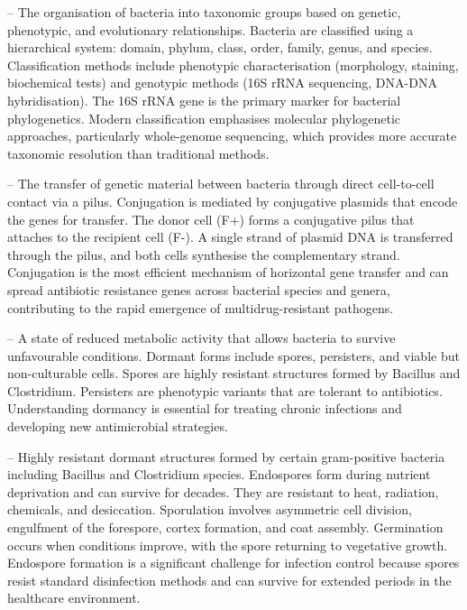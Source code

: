 -- The organisation of bacteria into taxonomic groups based on genetic, phenotypic, and evolutionary relationships. Bacteria are classified using a hierarchical system: domain, phylum, class, order, family, genus, and species. Classification methods include phenotypic characterisation (morphology, staining, biochemical tests) and genotypic methods (16S rRNA sequencing, DNA-DNA hybridisation). The 16S rRNA gene is the primary marker for bacterial phylogenetics. Modern classification emphasises molecular phylogenetic approaches, particularly whole-genome sequencing, which provides more accurate taxonomic resolution than traditional methods.

-- The transfer of genetic material between bacteria through direct cell-to-cell contact via a pilus. Conjugation is mediated by conjugative plasmids that encode the genes for transfer. The donor cell (F+) forms a conjugative pilus that attaches to the recipient cell (F-). A single strand of plasmid DNA is transferred through the pilus, and both cells synthesise the complementary strand. Conjugation is the most efficient mechanism of horizontal gene transfer and can spread antibiotic resistance genes across bacterial species and genera, contributing to the rapid emergence of multidrug-resistant pathogens.

-- A state of reduced metabolic activity that allows bacteria to survive unfavourable conditions. Dormant forms include spores, persisters, and viable but non-culturable cells. Spores are highly resistant structures formed by Bacillus and Clostridium. Persisters are phenotypic variants that are tolerant to antibiotics. Understanding dormancy is essential for treating chronic infections and developing new antimicrobial strategies.

-- Highly resistant dormant structures formed by certain gram-positive bacteria including Bacillus and Clostridium species. Endospores form during nutrient deprivation and can survive for decades. They are resistant to heat, radiation, chemicals, and desiccation. Sporulation involves asymmetric cell division, engulfment of the forespore, cortex formation, and coat assembly. Germination occurs when conditions improve, with the spore returning to vegetative growth. Endospore formation is a significant challenge for infection control because spores resist standard disinfection methods and can survive for extended periods in the healthcare environment.

